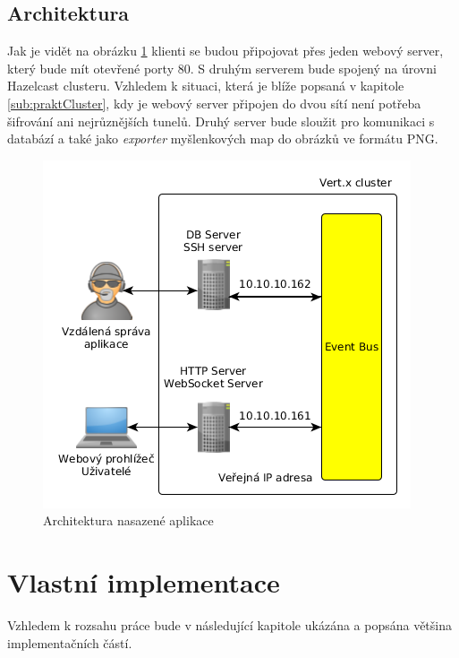 
\subsection{Architektura}

Jak je vidět na obrázku \ref{fig:architecture_real} klienti se budou připojovat přes jeden webový server, který bude mít otevřené porty 80. S druhým serverem bude spojený na úrovni Hazelcast clusteru. Vzhledem k situaci, která je blíže popsaná v kapitole \ref{sub:praktCluster}, kdy je webový server připojen do dvou sítí není potřeba šifrování ani nejrůznějších tunelů. Druhý server bude sloužit pro komunikaci s databází a také jako \emph{exporter} myšlenkových map do obrázků ve formátu PNG.

\begin{figure}
\begin{centering}
\includegraphics[scale=0.5]{obrazky/architecture_real}
\par\end{centering}
\caption{Architektura nasazené aplikace\label{fig:architecture_real}}
\end{figure}


\section{Vlastní implementace}

Vzhledem k rozsahu práce bude v následující kapitole ukázána a popsána většina implementačních částí.

